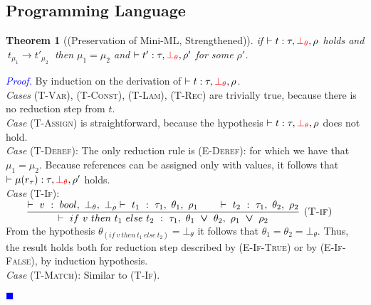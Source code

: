 \documentclass[a4paper,11pt,oneside]{article}
\theoremstyle{plain}
\newtheorem{theorem}[definition]{Theorem}
\renewenvironment{proof}{\noindent \begin{adjustwidth}{1.5em}{} \textcolor{blue}{\textit{Proof.}}}
{{\begin{tiny}\textcolor{blue}{$\blacksquare$}\end{tiny}}
\end{adjustwidth}~\\\noindent}
\newcommand{\bvee}{\boldsymbol{~\vee~}}
\newcommand{\typing}[4]{\vdash~#1~:~#2,~#3,~#4}
\newcommand{\bth}{\bot_\theta}
\newcommand{\brh}{\bot_\rho}
\newcommand{\evalstep}[4]{~#1_{\mu_#2} \rightarrow #3_{\mu_#4} ~}
\newcommand{\mem}{_{\mu}}\newcommand{\memp}{_{\mu'}}
\newcommand{\ghead}[2]{~#1~\stackrel{\epsilon}{\rightarrow}~#2~}
\begin{document}
\subsection{Programming Language}
\hypertarget{proof:preserv-prop-p}{} 
\begin{theorem}[(Preservation of Mini-ML, Strengthened)] 
if $\vdash t : \tau, \textcolor{red}{\bth}, \rho$ holds and $\evalstep{t}{1}{t'}{2}$ then $\mu_1 = \mu_2$ and $\vdash t' : \tau, \textcolor{red}{\bth}, \rho'$ for some $\rho'$.

\end{theorem}
\begin{proof}
\label{proof:preserv-prop-p}
  By induction on the derivation of $\vdash t : \tau, \textcolor{red}{\bth}, \rho$.\\
  
  \noindent\textit{Cases} \textsc{(T-Var), (T-Const), (T-Lam), (T-Rec)}  are trivially true, because there is no reduction step from $t$. \\
  
  \noindent\textit{Case} \textsc{(T-Assign)} is straightforward, because the hypothesis 
  $\vdash t : \tau, \textcolor{red}{\bth}, \rho $ does not hold.\\
  
   \noindent\textit{Case} \textsc{(T-Deref)}: The only reduction rule is \textsc{(E-Deref)}:  \infax[E-Deref]{\ghead{{!r_\tau}_{\mem}} {\mu_{}(r_\tau)}}
    for which we have that $\mu_1 = \mu_2$.  
    Because references can be assigned only with values, it follows that $\vdash \mu(r_\tau) : \tau, \textcolor{red}{\bth}, \rho' $ holds. \\ 

  \noindent\textit{Case} \textsc{(T-If)}: $\qquad \dfrac
	{
		\typing{v}{bool}{\bth}{\brh}
		\typing{t_1}{\tau_1}{\theta_1}{\rho_1} \qquad
		\typing{t_2}{\tau_1}{\theta_2}{\rho_2}
	}
	{	\typing{if~v~then~t_1~else~t_2}
		{\tau_1}{\theta_1 \bvee \theta_2}{\rho_1 \bvee \rho_2}}
	{\textsc{  (T-if)}}$ \\
  
	From the hypothesis $\theta_{(if~v~then~t_1~else~t_2)} = \bth$ it follows that $\theta_1 = \theta_2 = \bth$. Thus, the result holds both for reduction step described by \textsc{(E-If-True)} or by \textsc{(E-If-False)}, by induction hypothesis. \\
   
  \noindent\textit{Case} \textsc{(T-Match)}: \qquad Similar to \textsc{(T-If)}. \\
   

\end{proof}
\end{document}

